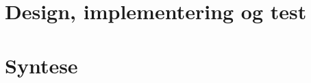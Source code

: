 \chapter{Design, implementering og test}\vspace{-.75cm}












\chapter{Syntese}






\begingroup
\label{litteraturliste}
\raggedright


\endgroup

\begin{appendices}
	
\end{appendices}


